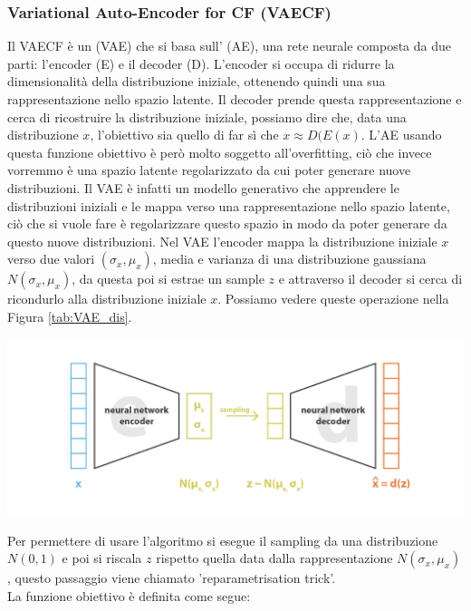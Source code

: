 \subsubsection{Variational Auto-Encoder for CF (VAECF)}
Il VAECF è un  (VAE) che si basa sull' (AE), una rete neurale composta da due parti: l'encoder (E) e il decoder (D).
L'encoder si occupa di ridurre la dimensionalità della distribuzione iniziale, ottenendo quindi una sua rappresentazione nello spazio latente. Il decoder prende questa rappresentazione e cerca di ricostruire la distribuzione iniziale, possiamo dire che, data una distribuzione $x$, l'obiettivo sia quello di far sì che $x \approx D(E(x)$.
L'AE usando questa funzione obiettivo è però molto soggetto all'overfitting, ciò che invece vorremmo è una spazio latente regolarizzato da cui poter generare nuove distribuzioni.
Il VAE è infatti un modello generativo che apprendere le distribuzioni iniziali e le mappa verso una rappresentazione nello spazio latente, ciò che si vuole fare è regolarizzare questo spazio in modo da poter generare da questo nuove distribuzioni. Nel VAE l'encoder mappa la distribuzione iniziale $x$ verso due valori $(\sigma_x, \mu_x)$, media e varianza di una distribuzione gaussiana $N(\sigma_x, \mu_x)$, da questa poi si estrae un sample $z$ e attraverso il decoder si cerca di ricondurlo alla distribuzione iniziale $x$. Possiamo vedere queste operazione nella Figura \ref{tab:VAE_dis}. 
\begin{center}
	\includegraphics[width=14.5cm]{figures/VAECF.png}
	\label{tab:VAE_dis}
\end{center}
Per permettere di usare l'algoritmo  si esegue il sampling da una distribuzione $N(0,1)$ e poi si riscala $z$ rispetto quella data dalla rappresentazione $N(\sigma_x, \mu_x)$, questo passaggio viene chiamato 'reparametrisation trick'.\\
La funzione obiettivo è definita come segue:
